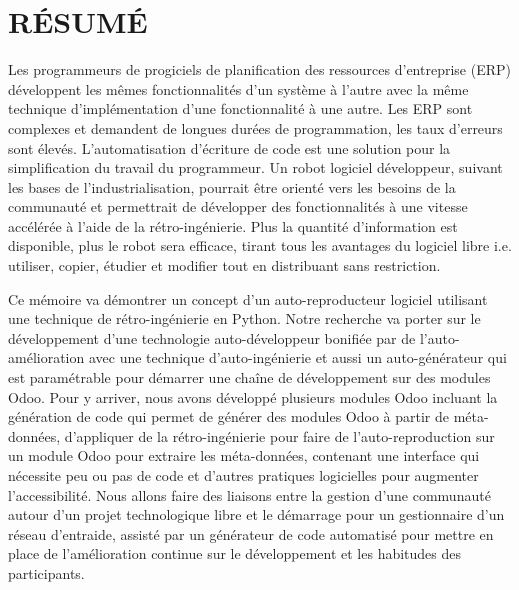 %
\chapter*{RÉSUMÉ}\thispagestyle{headings}

Les programmeurs de progiciels de planification des ressources d’entreprise (ERP) développent les mêmes fonctionnalités d’un système à l’autre avec la même technique d’implémentation d’une fonctionnalité à une autre. Les ERP sont complexes et demandent de longues durées de programmation, les taux d’erreurs sont élevés. L’automatisation d’écriture de code est une solution pour la simplification du travail du programmeur. Un robot logiciel développeur, suivant les bases de l’industrialisation, pourrait être orienté vers les besoins de la communauté et permettrait de développer des fonctionnalités à une vitesse accélérée à l’aide de la rétro-ingénierie. Plus la quantité d’information est disponible, plus le robot sera efficace, tirant tous les avantages du logiciel libre i.e. utiliser, copier, étudier et modifier tout en distribuant sans restriction.





Ce mémoire va démontrer un concept d'un auto-reproducteur logiciel utilisant une technique de rétro-ingénierie en Python. Notre recherche va porter sur le développement d'une technologie auto-développeur bonifiée par de l'auto-amélioration avec une technique d'auto-ingénierie et aussi un auto-générateur qui est paramétrable pour démarrer une chaîne de développement sur des modules Odoo. Pour y arriver, nous avons développé plusieurs modules Odoo incluant la génération de code qui permet de générer des modules Odoo à partir de méta-données, d'appliquer de la rétro-ingénierie pour faire de l'auto-reproduction sur un module Odoo pour extraire les méta-données, contenant une interface qui nécessite peu ou pas de code et d'autres pratiques logicielles pour augmenter l'accessibilité. Nous allons faire des liaisons entre la gestion d'une communauté autour d'un projet technologique libre et le démarrage pour un gestionnaire d'un réseau d'entraide, assisté par un générateur de code automatisé pour mettre en place de l'amélioration continue sur le développement et les habitudes des participants.

